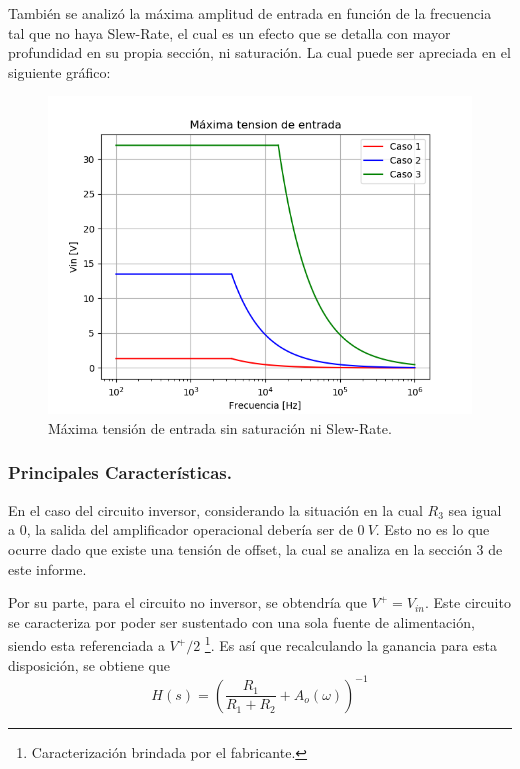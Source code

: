 También se analizó la máxima amplitud de entrada en función de la frecuencia tal que no haya Slew-Rate, el cual es un efecto que se detalla con mayor profundidad en su propia sección, ni saturación.
La cual puede ser apreciada en el siguiente gráfico:
\begin{figure}[H]	
	\centering
	\includegraphics[width=\textwidth]{Ejercicio1/Imagenes/maxvinsr.png}
	\caption{Máxima tensión de entrada sin saturación ni Slew-Rate.}
	\label{fig:MaxVinsr}
\end{figure} 
\subsubsection{Principales Características.}
En el caso del circuito inversor, considerando la situación en la cual $R_3$ sea igual a 0, la salida del amplificador operacional debería ser de $0 \ V$. Esto no es lo que ocurre dado que existe una tensión de offset, la cual se analiza en la sección 3 de este informe.

Por su parte, para el circuito no inversor,
se obtendría que $V^+ = V_{in}$. Este circuito se caracteriza por poder ser sustentado con una sola fuente de alimentación, siendo esta referenciada a $V^+/2$ \footnote{Caracterización brindada por el fabricante.}. Es así que recalculando la ganancia para esta disposición, se obtiene que 
\[
	H \left(s \right) = \left( \frac{R_1}{R_1 + R_2} + A_o\left( \omega \right) \right)^{-1}
\]

